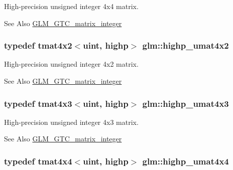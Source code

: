 High-\/precision unsigned integer 4x4 matrix. \begin{DoxySeeAlso}{See Also}
\hyperlink{group__gtc__matrix__integer}{G\-L\-M\-\_\-\-G\-T\-C\-\_\-matrix\-\_\-integer} 
\end{DoxySeeAlso}
\hypertarget{group__gtc__matrix__integer_ga4015bf99a981bf271fd516f9b2cb6724}{
\subsubsection[{highp\-\_\-umat4x2}]{\setlength{\rightskip}{0pt plus 5cm}typedef tmat4x2$<$uint, highp$>$ {\bf glm\-::highp\-\_\-umat4x2}}}\label{group__gtc__matrix__integer_ga4015bf99a981bf271fd516f9b2cb6724}
High-\/precision unsigned integer 4x2 matrix. \begin{DoxySeeAlso}{See Also}
\hyperlink{group__gtc__matrix__integer}{G\-L\-M\-\_\-\-G\-T\-C\-\_\-matrix\-\_\-integer} 
\end{DoxySeeAlso}
\hypertarget{group__gtc__matrix__integer_gaa394320db559302e18c8b64013b8d7fb}{
\subsubsection[{highp\-\_\-umat4x3}]{\setlength{\rightskip}{0pt plus 5cm}typedef tmat4x3$<$uint, highp$>$ {\bf glm\-::highp\-\_\-umat4x3}}}\label{group__gtc__matrix__integer_gaa394320db559302e18c8b64013b8d7fb}
High-\/precision unsigned integer 4x3 matrix. \begin{DoxySeeAlso}{See Also}
\hyperlink{group__gtc__matrix__integer}{G\-L\-M\-\_\-\-G\-T\-C\-\_\-matrix\-\_\-integer} 
\end{DoxySeeAlso}
\hypertarget{group__gtc__matrix__integer_gaf5365128f6fd506442843fb5a441f385}{
\subsubsection[{highp\-\_\-umat4x4}]{\setlength{\rightskip}{0pt plus 5cm}typedef tmat4x4$<$uint, highp$>$ {\bf glm\-::highp\-\_\-umat4x4}}}\label{group__gtc__matrix__integer_gaf5365128f6fd506442843fb5a441f385}
